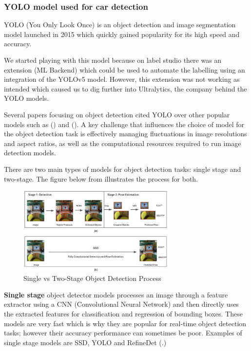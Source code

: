 \subsubsection{YOLO model used for car detection}
YOLO (You Only Look Once) is an object detection and image segmentation model
launched in 2015 which quickly gained popularity for its high speed and
accuracy.

We started playing with this model because on label studio there was an
extension (ML Backend) which could be used to automate the labelling using an
integration of the YOLOv5 model. However, this extension was not working as
intended which caused us to dig further into Ultralytics, the company behind the
YOLO models.

Several papers focusing on object detection cited YOLO over other popular models
such as (\cite{firedetectionyolo}) and (\cite{polypdetectionyolo}). A key
challenge that influences the choice of model for the object detection task is
effectively managing fluctuations in image resolutions and aspect ratios, as
well as the computational resources required to run image detection models.

There are two main types of models for object detection tasks: single stage and
two-stage. The figure below from \cite{singlevstwodetectorimg} illustrates the
process for both.

\begin{figure}[htbp]
  \centering
  \includegraphics[width=0.7\textwidth]{images/single-vs-two-stage-obj-detector.png}
  \caption{Single vs Two-Stage Object Detection Process}
\end{figure}
\textbf{Single stage} object detector models processes an image through a
feature extractor using a CNN (Convolutional Neural Network) and then directly
uses the extracted features for classification and regression of bounding boxes.
These models are very fast which is why they are popular for real-time object
detection tasks; however their accuracy performance can sometimes be poor.
Examples of single stage models are SSD, YOLO and RefineDet
(\cite{yoloversionsliterature}.)

